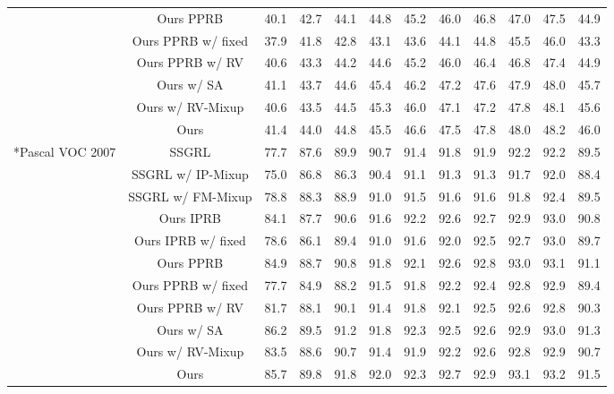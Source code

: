 \documentclass[lettersize,journal]{IEEEtran}
\begin{document}
\begin{table*}
\begin{tabular}{c|c|ccccccccc|c}
  \centering ~ & Ours PPRB & 40.1 & 42.7 & 44.1 & 44.8 & 45.2 & 46.0 & 46.8 & 47.0 & 47.5 & 44.9 \\
  \centering ~ & Ours PPRB w/ fixed  & 37.9 & 41.8 & 42.8 & 43.1 & 43.6 & 44.1 & 44.8 & 45.5 & 46.0 & 43.3 \\
  \centering ~ & Ours PPRB w/ RV & 40.6 & 43.3 & 44.2 & 44.6 & 45.2 & 46.0 & 46.4 & 46.8 & 47.4 & 44.9 \\
  \centering ~ & Ours w/ SA & 41.1 & 43.7 & 44.6 & 45.4 & 46.2 & 47.2 & 47.6 & 47.9 & 48.0 & 45.7 \\
  \centering ~ & Ours w/ RV-Mixup & 40.6 & 43.5 & 44.5 & 45.3 & 46.0 & 47.1 & 47.2 & 47.8 & 48.1 & 45.6 \\
  \centering ~ & Ours & 41.4 & 44.0 & 44.8 & 45.5 & 46.6 & 47.5 & 47.8 & 48.0 & 48.2 & 46.0 \\
  \hline
  \hline
  \centering \multirow{10}*{Pascal VOC 2007} & SSGRL & 77.7 & 87.6 & 89.9 & 90.7 & 91.4 & 91.8 & 91.9 & 92.2 & 92.2 & 89.5 \\
  \centering ~ & SSGRL w/ IP-Mixup & 75.0 & 86.8 & 86.3 & 90.4 & 91.1 & 91.3 & 91.3 & 91.7 & 92.0 & 88.4 \\
  \centering ~ & SSGRL w/ FM-Mixup & 78.8 & 88.3 & 88.9 & 91.0 & 91.5 & 91.6 & 91.6 & 91.8 & 92.4 & 89.5 \\
  \centering ~ & Ours IPRB & 84.1 & 87.7 & 90.6 & 91.6 & 92.2 & 92.6 & 92.7 & 92.9 & 93.0 & 90.8 \\
  \centering ~ & Ours IPRB w/ fixed  & 78.6 & 86.1 & 89.4 & 91.0 & 91.6 & 92.0 & 92.5 & 92.7 & 93.0 & 89.7 \\
  \centering ~ & Ours PPRB & 84.9 & 88.7 & 90.8 & 91.8 & 92.1 & 92.6 & 92.8 & 93.0 & 93.1 & 91.1 \\
  \centering ~ & Ours PPRB w/ fixed  & 77.7 & 84.9 & 88.2 & 91.5 & 91.8 & 92.2 & 92.4 & 92.8 & 92.9 & 89.4 \\
  \centering ~ & Ours PPRB w/ RV & 81.7 & 88.1 & 90.1 & 91.4 & 91.8 & 92.1 & 92.5 & 92.6 & 92.8 & 90.3 \\
  \centering ~ & Ours w/ SA & 86.2 & 89.5 & 91.2 & 91.8 & 92.3 & 92.5 & 92.6 & 92.9 & 93.0 & 91.3 \\
  \centering ~ & Ours w/ RV-Mixup & 83.5 & 88.6 & 90.7 & 91.4 & 91.9 & 92.2 & 92.6 & 92.8 & 92.9 & 90.7 \\
  \centering ~ & Ours & 85.7 & 89.8 & 91.8 & 92.0 & 92.3 & 92.7 & 92.9 & 93.1 & 93.2 & 91.5 \\
  \hline      
  \end{tabular}
  \vspace{10pt}

\end{table*}
\end{document}
